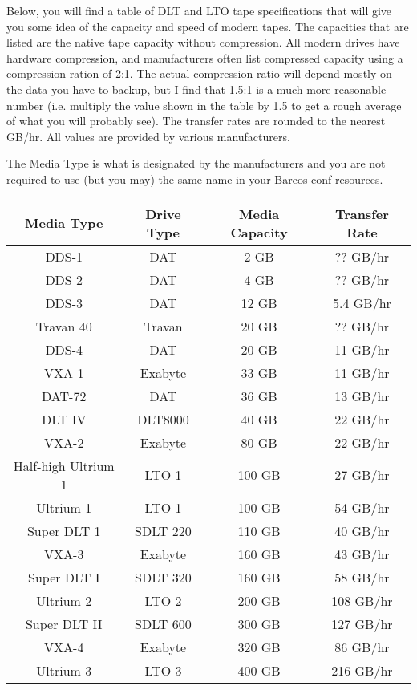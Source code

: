Below, you will find a table of DLT and LTO tape specifications that will
give you some idea of the capacity and speed of modern tapes. The
capacities that are listed are the native tape capacity without compression.
All modern drives have hardware compression, and manufacturers often list
compressed capacity using a compression ration of 2:1. The actual compression
ratio will depend mostly on the data you have to backup, but I find that
1.5:1 is a much more reasonable number (i.e. multiply the value shown in
the table by 1.5 to get a rough average of what you will probably see).
The transfer rates are rounded to the nearest GB/hr.  All values are provided
by various manufacturers.

The Media Type is what is designated by the manufacturers and you are not
required to use (but you may) the same name in your Bareos conf resources.


\begin{tabular}{|c|c|c|c}
Media Type      & Drive Type & Media Capacity & Transfer Rate \\ \hline
DDS-1              & DAT        & 2 GB &        ?? GB/hr   \\ \hline
DDS-2              & DAT        & 4 GB &        ?? GB/hr   \\ \hline
DDS-3              & DAT        & 12 GB &       5.4 GB/hr   \\ \hline
Travan 40          & Travan     & 20 GB &       ?? GB/hr    \\ \hline
DDS-4              & DAT        & 20 GB &       11 GB/hr    \\ \hline
VXA-1              & Exabyte    & 33 GB &       11 GB/hr    \\ \hline
DAT-72             & DAT        & 36 GB &       13 GB/hr    \\ \hline
DLT IV             & DLT8000    & 40 GB  &      22 GB/hr    \\ \hline
VXA-2              & Exabyte    & 80 GB &       22 GB/hr    \\ \hline
Half-high Ultrium 1 & LTO 1      & 100 GB &      27 GB/hr    \\ \hline
Ultrium 1          & LTO 1      & 100 GB &      54 GB/hr    \\ \hline
Super DLT 1        & SDLT 220   & 110 GB &      40 GB/hr    \\ \hline
VXA-3              & Exabyte    & 160 GB &      43 GB/hr    \\ \hline
Super DLT I        & SDLT 320   & 160 GB &      58 GB/hr    \\ \hline
Ultrium 2          & LTO 2      & 200 GB &      108 GB/hr   \\ \hline
Super DLT II       & SDLT 600   & 300 GB &      127 GB/hr   \\ \hline
VXA-4              & Exabyte    & 320 GB &      86 GB/hr    \\ \hline
Ultrium 3          & LTO 3      & 400 GB &      216 GB/hr   \\ \hline
\end{tabular}
